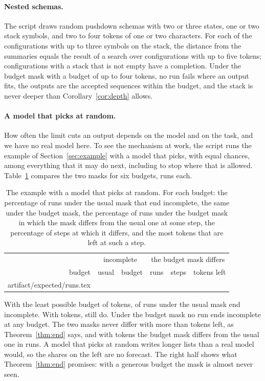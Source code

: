 \documentclass[acmsmall,nonacm,screen]{acmart}
\makeatletter
\newcommand{\claim}[2]{#2}
\newcommand{\rows}[1]{\@@input artifact/expected/#1.tex }
\makeatother
\begin{document}
\paragraph{Nested schemas.} The script draws \exPushdown{} random pushdown schemas with two
or three states, one or two stack symbols, and two to four tokens of one or two characters.
\claim{nested}{For each of the \exConfigurations{} configurations with up to three symbols
on the stack, the distance from the summaries equals the result of a search over
configurations with up to five tokens; \exSpanning{} configurations with a stack that is not
empty have a completion. Under the budget mask with a budget of up to four tokens, no run
fails where an output fits, the outputs are the accepted sequences within the budget, and
the stack is never deeper than Corollary~\ref{cor:depth} allows.}

\paragraph{A model that picks at random.} How often the limit cuts an output depends on the
model and on the task, and we have no real model here. To see the mechanism at work, the
script runs the example of Section~\ref{sec:example} with a model that picks, with equal
chances, among everything that it may do next, including to stop where that is allowed.
Table~\ref{tab:runs} compares the two masks for six budgets, \exRuns{} runs each.

\begin{table}
\caption{The example with a model that picks at random. For each budget: the percentage of
runs under the usual mask that end incomplete, the same under the budget mask, the
percentage of runs under the budget mask in which the mask differs from the usual one at some
step, the percentage of steps at which it differs, and the most tokens that are left at
such a step.}\label{tab:runs}
\begin{tabular}{r@{\qquad}rr@{\qquad}rrr}
\toprule
 & \multicolumn{2}{c}{incomplete} & \multicolumn{3}{c}{the budget mask differs} \\
budget & usual & budget & runs & steps & tokens left \\
\midrule
\rows{runs}
\bottomrule
\end{tabular}
\end{table}

\claim{runs}{With the least possible budget of \exBudgetTight{} tokens, \exCutTightRuns{} of
\exRuns{} runs under the usual mask end incomplete. With \exBudgetLoose{} tokens,
\exCutLooseRuns{} still do. Under the budget mask no run ends incomplete at any budget. The
two masks never differ with more than \exExampleWidest{} tokens left, as
Theorem~\ref{thm:end} says, and with \exBudgetLoose{} tokens the budget mask differs from the
usual one in \exTouchedLooseRuns{} runs.} A model that picks at random writes longer lists
than a real model would, so the shares on the left are no forecast. The right half shows
what Theorem~\ref{thm:end} promises: with a generous budget the mask is almost never seen.
\end{document}
